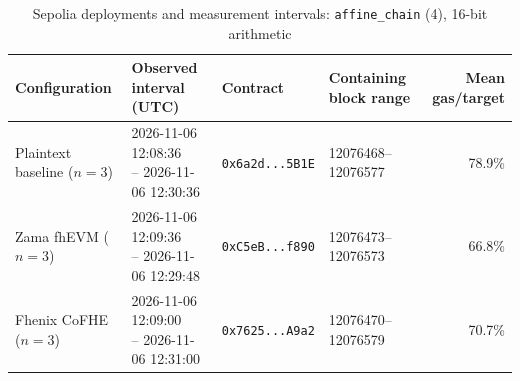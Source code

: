 \begin{table}[!t]
\caption{Sepolia deployments and measurement intervals: \texttt{affine\_chain} (4), 16-bit arithmetic}
\label{tab:sepolia-experiment-deployments-circuits-euint16-circuits-w16-affine-chain-k4}
\centering
\footnotesize
\setlength{\tabcolsep}{4pt}
\begin{tabular}{|l|l|l|l|r|}
\hline
\textbf{Configuration} &
\textbf{Observed interval (UTC)} &
\textbf{Contract} &
\textbf{Containing block range} &
\textbf{Mean gas/target} \\
\hline
Plaintext baseline (\(n=3\)) &
\shortstack[l]{2026-11-06 12:08:36 \\ -- 2026-11-06 12:30:36} &
\texttt{0x6a2d...5B1E} &
12076468--12076577 &
78.9\% \\
\hline
Zama fhEVM (\(n=3\)) &
\shortstack[l]{2026-11-06 12:09:36 \\ -- 2026-11-06 12:29:48} &
\texttt{0xC5eB...f890} &
12076473--12076573 &
66.8\% \\
\hline
Fhenix CoFHE (\(n=3\)) &
\shortstack[l]{2026-11-06 12:09:00 \\ -- 2026-11-06 12:31:00} &
\texttt{0x7625...A9a2} &
12076470--12076579 &
70.7\% \\
\hline
\end{tabular}
\end{table}
